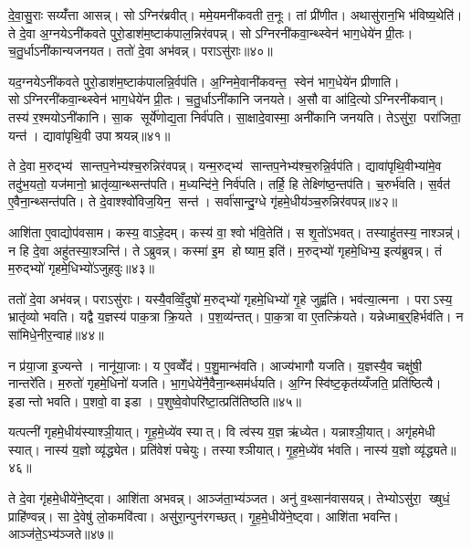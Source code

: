 दे॒वा॒सु॒राः सय्यँ॑त्ता आसन्न्। सोऽग्निर॑ब्रवीत्। ममे॒यमनी॑कवती त॒नूः। तां प्री॑णीत। अथासु॑रान॒भि भ॑विष्य॒थेति॑। ते दे॒वा अ॒ग्नयेऽनी॑कवते पुरो॒डाश॑म॒ष्टाक॑पाल॒न्निर॑वपन्न्। सोऽग्निरनी॑कवा॒न्थ्स्वेन॑ भाग॒धेये॑न प्री॒तः। च॒तु॒र्धाऽनी॑कान्यजनयत। ततो॑ दे॒वा अभ॑वन्न्। पराऽसु॑राः॥४०॥

यद॒ग्नयेऽनी॑कवते पुरो॒डाश॑म॒ष्टाक॑पालन्नि॒र्वप॑ति। अ॒ग्निमे॒वानी॑कवन्त॒ स्वेन॑ भाग॒धेये॑न प्रीणाति। सोऽग्निरनी॑कवा॒न्थ्स्वेन॑ भाग॒धेये॑न प्री॒तः। च॒तु॒र्धाऽनी॑कानि जनयते। अ॒सौ वा आ॑दि॒त्योऽग्निरनी॑कवान्। तस्य॑ र॒श्मयोऽनी॑कानि। सा॒क सूर्ये॑णोद्य॒ता निर्व॑पति। सा॒क्षादे॒वास्मा॒ अनी॑कानि जनयति। तेऽसु॑रा॒ परा॑जिता॒ यन्त॑। द्यावा॑पृथि॒वी उपाश्रयन्न्॥४१॥

ते दे॒वा म॒रुद्भ्य॑ सान्तप॒नेभ्य॑श्च॒रुन्निर॑वपन्न्। यन्म॒रुद्भ्य॑ सान्तप॒नेभ्य॑श्च॒रुन्नि॒र्वप॑ति। द्यावा॑पृथि॒वीभ्या॑मे॒व तदु॑भ॒यतो॒ यज॑मानो॒ भ्रातृ॑व्या॒न्थ्सन्त॑पति। म॒ध्यन्दि॑ने॒ निर्व॑पति। तर्\mbox{}हि॒ हि तेक्ष्णि॑ष्ठ॒न्तप॑ति। च॒रुर्भ॑वति। स॒र्वत॑ ए॒वैना॒न्थ्सन्त॑पति। ते दे॒वाश्श्वो॑विज॒यिन॒ सन्त॑। सर्वा॑सान्दु॒ग्धे गृ॑हमे॒धीय॑ञ्च॒रुन्निर॑वपन्न्॥४२॥

आशि॑ता ए॒वाद्योप॑वसाम। कस्य॒ वाऽहे॒दम्। कस्य॑ वा॒ श्वो भ॑वि॒तेति॑। स शृ॒तो॑ऽभवत्। तस्याहु॑तस्य॒ नाश्ञन्न्॑। न हि दे॒वा अहु॑तस्या॒श्ञन्ति॑। तेऽब्रुवन्न्। कस्मा॑ इ॒म होष्याम॒ इति॑। म॒रुद्भ्यो॑ गृहमे॒धिभ्य॒ इत्य॑ब्रुवन्न्। तं म॒रुद्भ्यो॑ गृहमे॒धिभ्यो॑ऽजुहवुः॥४३॥

ततो॑ दे॒वा अभ॑वन्न्। पराऽसु॑राः। यस्यै॒वव्विँ॒दुषो॑ म॒रुद्भ्यो॑ गृहमे॒धिभ्यो॑ गृ॒हे जुह्व॑ति। भव॑त्या॒त्मना। पराऽस्य॒ भ्रातृ॑व्यो भवति। यद्वै य॒ज्ञस्य॑ पाक॒त्रा क्रि॒यते। प॒श॒व्य॑न्तत्। पा॒क॒त्रा वा ए॒तत्क्रि॑यते। यन्नेध्माब॒र्॒हिर्भव॑ति। न सा॑मिधे॒नीर॒न्वाह॑॥४४॥

न प्र॑या॒जा इ॒ज्यन्ते। नानू॑या॒जाः। य ए॒वव्वेँद॑। प॒शु॒मान्भ॑वति। आज्य॑भागौ यजति। य॒ज्ञस्यै॒व चक्षु॑षी॒ नान्तरे॑ति। म॒रुतो॑ गृहमे॒धिनो॑ यजति। भा॒ग॒धेये॑नै॒वैना॒न्थ्सम॑र्धयति। अ॒ग्निस्वि॑ष्ट॒कृत॑य्यँजति॒ प्रति॑ष्ठित्यै। इडान्तो भवति। प॒शवो॒ वा इडा। प॒शुष्वे॒वोपरि॑ष्टा॒त्प्रति॑तिष्ठति॥४५॥

यत्पत्नी॑ गृहमे॒धीय॑स्याश्ञी॒यात्। गृ॒ह॒मे॒ध्ये॑व स्यात्। वि त्व॑स्य य॒ज्ञ ऋ॑ध्येत। यन्नाश्ञी॒यात्। अगृ॑हमेधी स्यात्। नास्य॑ य॒ज्ञो व्यृ॑द्ध्येत। प्रति॑वेशं पचेयुः। तस्याश्ञीयात्। गृ॒ह॒मे॒ध्ये॑व भ॑वति। नास्य॑ य॒ज्ञो व्यृ॑द्ध्यते॥४६॥

ते दे॒वा गृ॑हमे॒धीये॑ने॒ष्ट्वा। आशि॑ता अभवन्न्। आञ्ज॑ता॒भ्य॑ञ्जत। अनु॑ व॒थ्सान॑वासयन्न्। तेभ्योऽसु॑रा॒ ख्षुधं॒ प्राहि॑ण्वन्न्। सा दे॒वेषु॑ लो॒कमवि॑त्वा। असु॑रा॒न्पुन॑रगच्छत्। गृ॒ह॒मे॒धीये॑ने॒ष्ट्वा। आशि॑ता भवन्ति। आञ्ज॑ते॒ऽभ्य॑ञ्जते॥४७॥

